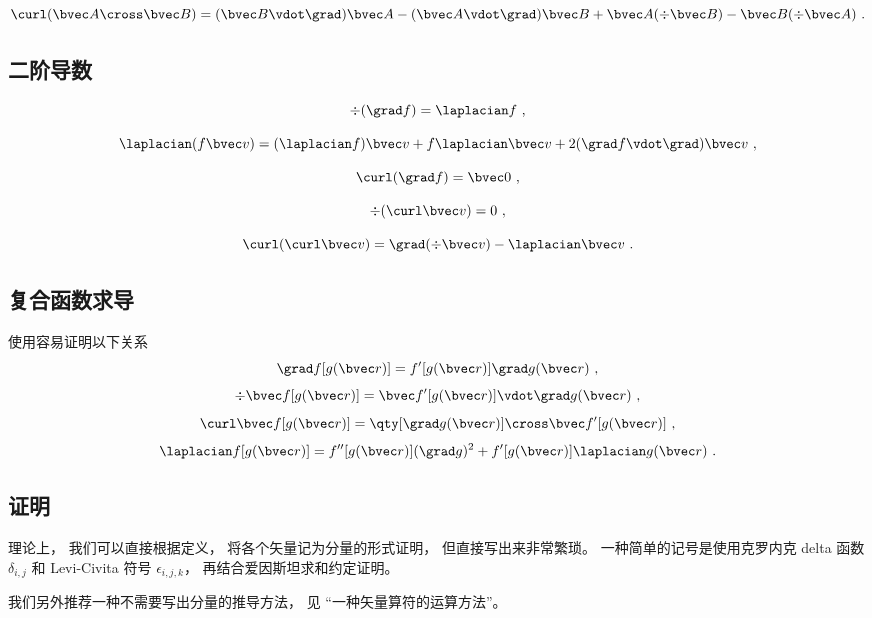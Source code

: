 \begin{equation}\label{eq_VopEq_6}
\curl (\bvec A \cross \bvec B) = (\bvec B \vdot \grad) \bvec A - (\bvec A \vdot \grad) \bvec B + \bvec A (\div \bvec B) - \bvec B (\div \bvec A)~.
\end{equation}

\subsection{二阶导数}

\begin{equation}
\div (\grad f) = \laplacian f~,
\end{equation}

\begin{equation}\label{eq_VopEq_5}
\laplacian (f \bvec v) = (\laplacian f)\bvec v + f \laplacian \bvec v + 2 (\grad f \vdot \grad) \bvec v~,
\end{equation}

\begin{equation}
\curl (\grad f) = \bvec 0~,
\end{equation}

\begin{equation}
\div (\curl \bvec v) = 0~,
\end{equation}

\begin{equation}\label{eq_VopEq_7}
\curl(\curl \bvec v) = \grad(\div\bvec v) - \laplacian \bvec v~.
\end{equation}

\subsection{复合函数求导}
使用容易证明以下关系
\begin{equation}
\grad f[g(\bvec r)] = f'[g(\bvec r)] \grad g(\bvec r)~,
\end{equation}
\begin{equation}
\div \bvec f[g(\bvec r)] = \bvec f'[g(\bvec r)] \vdot \grad g(\bvec r)~,
\end{equation}
\begin{equation}
\curl \bvec f[g(\bvec r)] = \qty[\grad g(\bvec r)] \cross \bvec f'[g(\bvec r)]~,
\end{equation}
\begin{equation}
\laplacian f[g(\bvec r)] = f''[g(\bvec r)] (\grad g)^2 + f'[g(\bvec r)] \laplacian g(\bvec r)~.
\end{equation}

\subsection{证明}
理论上， 我们可以直接根据定义， 将各个矢量记为分量的形式证明， 但直接写出来非常繁琐。 一种简单的记号是使用克罗内克 delta 函数 $\delta_{i,j}$ 和 Levi-Civita 符号 $\epsilon_{i,j,k}$， 再结合爱因斯坦求和约定证明。

我们另外推荐一种不需要写出分量的推导方法， 见 “一种矢量算符的运算方法”。
